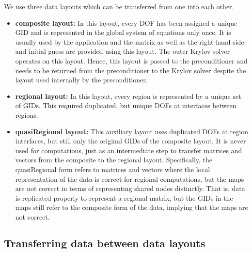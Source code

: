 \documentclass[11pt]{article}
\begin{document}
We use three data layouts which can be transferred from one into each other.
\begin{itemize}
\item {\bf composite layout:} In this layout, every DOF has been assigned a unique GID and is represented in the global system of equations only once.
It is usually used by the application and the matrix as well as the right-hand side and initial guess are provided using this layout.
The outer Krylov solver operates on this layout. Hence, this layout is passed to the preconditioner and needs to be returned from the preconditioner
to the Krylov solver despite the layout used internally by the preconditioner.
\item {\bf regional layout:} In this layout, every region is represented by a unique set of GIDs.
This required duplicated, but unique DOFs at interfaces between regions.
\item {\bf quasiRegional layout:} This auxiliary layout uses duplicated DOFs at region interfaces,
but still only the original GIDs of the composite layout.
It is never used for computations, just as an intermediate step to transfer matrices and vectors from the composite to the regional layout.
Specifically, the quasiRegional form refers to matrices and vectors
where the local representation of the data is correct for
regional computations, but the maps are not correct in terms of
representing shared nodes distinctly. That is, data is replicated properly
to represent a regional matrix, but the GIDs in the maps still refer to the composite form of the data,
implying that the maps are not correct.
\end{itemize}

\subsection{Transferring data between data layouts}
\label{sec:TransferDataLayouts}
\end{document}
